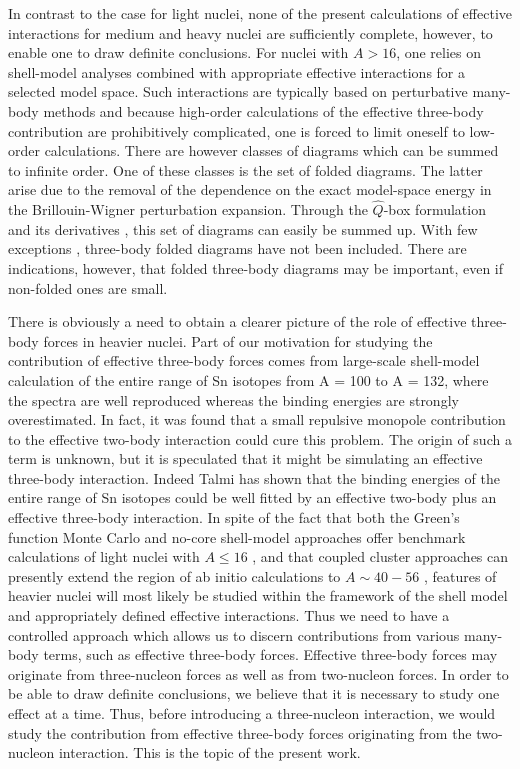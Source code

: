 \documentclass[prc,aps,amsmath,amssymb,preprintnumbers,showpacs,twocolumn]{revtex4}
\begin{document}
In contrast to the case for light nuclei,
none of the present  calculations of effective interactions for medium and heavy nuclei
are 
sufficiently complete, however, to enable one to draw definite conclusions.
For nuclei with $A> 16$, one relies on shell-model analyses combined with appropriate effective interactions for a selected model space. 
Such interactions are typically based on perturbative many-body methods and  
because high-order calculations of the effective three-body contribution are 
prohibitively complicated, one is forced to limit oneself to low-order 
calculations. 
There are however classes of diagrams which can be summed to infinite order.
One of these classes is the set of folded diagrams.
The latter arise
due to the removal of the dependence on     %
the exact model-space energy
in the Brillouin-Wigner perturbation expansion. Through the $\hat{Q}$-box
formulation and its derivatives \cite{oslo,ko}, 
this set of diagrams can easily be summed
up.
With few exceptions \cite{herbert2}, three-body   %
folded diagrams have not been included. 
There are indications, however, that folded three-body diagrams may be 
important, even if non-folded ones are small. 

There is obviously a need to obtain a clearer 
picture of the role of effective three-body forces in heavier nuclei. Part 
of our motivation for studying the contribution of effective three-body 
forces comes from large-scale shell-model calculation of the entire range 
of Sn isotopes from A = 100 to A = 132, where the spectra are well 
reproduced whereas the binding energies are strongly overestimated. In 
fact, it was found that a small repulsive monopole contribution to the 
effective two-body interaction could cure this problem. The origin of
such a term is unknown, but it is speculated that it might be simulating 
an effective three-body interaction. Indeed Talmi \cite{igal} 
has shown that the binding energies of the entire range of Sn isotopes 
could be well fitted by an effective two-body plus an effective three-body 
interaction. In spite of the fact that both the Green's function Monte Carlo 
and no-core   %
shell-model approaches offer benchmark calculations of light nuclei 
with $A\le 16$ 
\cite{bob1,bob2,bob3,petr_erich2002,petr_erich2003}, and that coupled cluster
approaches can presently extend the region of ab initio  
calculations to $A\sim 40-56$ \cite{cc1}, 
features of heavier nuclei will most likely be studied 
within the framework of the shell model and appropriately defined 
effective interactions. Thus    %
we need to have a controlled approach which allows us to discern 
contributions from various many-body terms, such as effective three-body 
forces. 
Effective three-body forces may originate from three-nucleon forces as 
well as from two-nucleon forces. In order to be able to draw definite 
conclusions, we believe that it is necessary to study one effect at a time. 
Thus, before introducing a  three-nucleon interaction, we would study 
the contribution from effective three-body forces originating from the 
two-nucleon interaction. This is the topic of the present work. 
\end{document}

